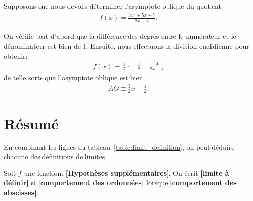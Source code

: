\documentclass[main.tex]{subfiles}
\begin{document}
\begin{example}

    Supposons que nous devons déterminer l'asymptote oblique du quotient
    \begin{align}
        f(x) = \frac {3x^2 + 5x + 7} {2 x + 4}.
    \end{align}

    On vérifie tout d'abord que la différence des degrés entre le numérateur et le dénominateur est bien de $1$.
    Ensuite,
    nous effectuons la division euclidienne pour obtenir:
    \begin{align}
        f(x) = \frac 3 2 x - \frac 1 2 + \frac 9 {2 x + 4}
    \end{align}
    de telle sorte que l'asymptote oblique est bien
    \begin{align}
        AO \equiv \frac 3 2 x - \frac 1 2.
    \end{align}
\end{example}

\section{Résumé}

En combinant les lignes du tableau~\ref{table:limit_definition},
on peut déduire chacune des définitions de limites.

\begin{definition}
    [Limite]

    Soit $f$ une fonction.
    \textbf{[Hypothèses supplémentaires]}.
    On écrit \textbf{[limite à définir]}
    si \textbf{[comportement des ordonnées]}
    lorsque \textbf{[comportement des abscisses]}.
\end{definition}
\end{document}
